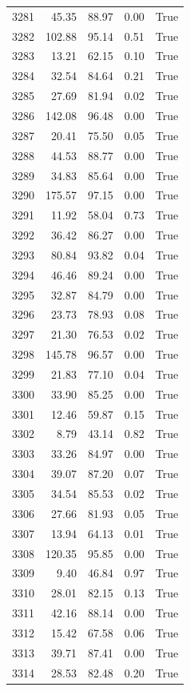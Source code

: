 \begin{longtable}{rrrrr}
3281 & 45.35 & 88.97 & 0.00 & True \\
3282 & 102.88 & 95.14 & 0.51 & True \\
3283 & 13.21 & 62.15 & 0.10 & True \\
3284 & 32.54 & 84.64 & 0.21 & True \\
3285 & 27.69 & 81.94 & 0.02 & True \\
3286 & 142.08 & 96.48 & 0.00 & True \\
3287 & 20.41 & 75.50 & 0.05 & True \\
3288 & 44.53 & 88.77 & 0.00 & True \\
3289 & 34.83 & 85.64 & 0.00 & True \\
3290 & 175.57 & 97.15 & 0.00 & True \\
3291 & 11.92 & 58.04 & 0.73 & True \\
3292 & 36.42 & 86.27 & 0.00 & True \\
3293 & 80.84 & 93.82 & 0.04 & True \\
3294 & 46.46 & 89.24 & 0.00 & True \\
3295 & 32.87 & 84.79 & 0.00 & True \\
3296 & 23.73 & 78.93 & 0.08 & True \\
3297 & 21.30 & 76.53 & 0.02 & True \\
3298 & 145.78 & 96.57 & 0.00 & True \\
3299 & 21.83 & 77.10 & 0.04 & True \\
3300 & 33.90 & 85.25 & 0.00 & True \\
3301 & 12.46 & 59.87 & 0.15 & True \\
3302 & 8.79 & 43.14 & 0.82 & True \\
3303 & 33.26 & 84.97 & 0.00 & True \\
3304 & 39.07 & 87.20 & 0.07 & True \\
3305 & 34.54 & 85.53 & 0.02 & True \\
3306 & 27.66 & 81.93 & 0.05 & True \\
3307 & 13.94 & 64.13 & 0.01 & True \\
3308 & 120.35 & 95.85 & 0.00 & True \\
3309 & 9.40 & 46.84 & 0.97 & True \\
3310 & 28.01 & 82.15 & 0.13 & True \\
3311 & 42.16 & 88.14 & 0.00 & True \\
3312 & 15.42 & 67.58 & 0.06 & True \\
3313 & 39.71 & 87.41 & 0.00 & True \\
3314 & 28.53 & 82.48 & 0.20 & True \\

\end{longtable}
